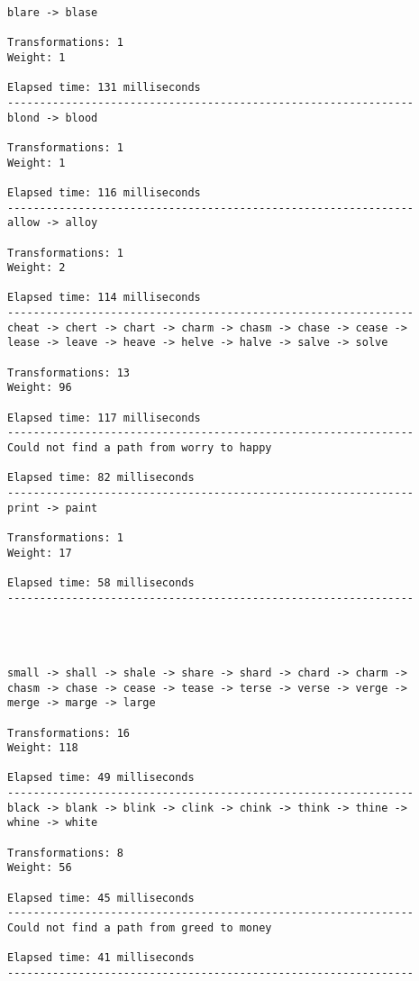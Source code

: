 \documentclass{article}
\begin{document}
\vspace{0.2cm}

\begin{verbatim}
blare -> blase

Transformations: 1
Weight: 1

Elapsed time: 131 milliseconds
---------------------------------------------------------------
blond -> blood

Transformations: 1
Weight: 1

Elapsed time: 116 milliseconds
---------------------------------------------------------------
allow -> alloy

Transformations: 1
Weight: 2

Elapsed time: 114 milliseconds
---------------------------------------------------------------
cheat -> chert -> chart -> charm -> chasm -> chase -> cease ->
lease -> leave -> heave -> helve -> halve -> salve -> solve

Transformations: 13
Weight: 96

Elapsed time: 117 milliseconds
---------------------------------------------------------------
Could not find a path from worry to happy

Elapsed time: 82 milliseconds
---------------------------------------------------------------
print -> paint

Transformations: 1
Weight: 17

Elapsed time: 58 milliseconds
---------------------------------------------------------------




small -> shall -> shale -> share -> shard -> chard -> charm ->
chasm -> chase -> cease -> tease -> terse -> verse -> verge ->
merge -> marge -> large

Transformations: 16
Weight: 118

Elapsed time: 49 milliseconds
---------------------------------------------------------------
black -> blank -> blink -> clink -> chink -> think -> thine ->
whine -> white

Transformations: 8
Weight: 56

Elapsed time: 45 milliseconds
---------------------------------------------------------------
Could not find a path from greed to money

Elapsed time: 41 milliseconds
---------------------------------------------------------------
\end{verbatim}
\end{document}

